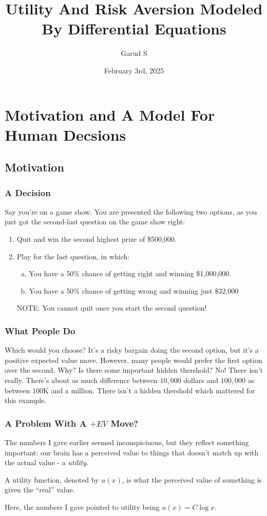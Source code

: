 \documentclass{beamer}
\title{Utility And Risk Aversion Modeled By Differential Equations}
\author{Garud S}
\date{February 3rd, 2025}
\begin{document}
\frame{\titlepage}
\section{Motivation and A Model For Human Decsions}
    \subsection{Motivation}
        \begin{frame}
            \frametitle{A Decision}
            \begin{example}
                Say you're on a game show. You are presented the following two options, as you just got the second-last question on the game show right: \pause
            \begin{enumerate}
                \item Quit and win the second highest prize of \$500,000. \pause
                \item Play for the last question, in which: \pause
                \begin{enumerate}[a)]                    
                    \item You have a 50\% chance of getting right and winning \$1,000,000.
                    \item You have a 50\% chance of getting wrong and winning just \$32,000 
                \end{enumerate} 
                \pause NOTE: You cannot quit once you start the second question!
            \end{enumerate} 
            \end{example}
        \end{frame}
        \begin{frame}\frametitle{What People Do}
            Which would you choose? It's a risky bargain doing the second option, but it's a positive expected value move. 
            \pause However, many people would prefer the first option over the second.
            Why? Is there some important hidden thershold? \pause No! There isn't really. There's about as much difference between $10,000$ dollars and $100,000$ as between $100$K and a million.
            There isn't a hidden thershold which mattered for this example.
        \end{frame}
        \begin{frame}
            \frametitle{A Problem With A $+EV$ Move?}
            The numbers I gave earlier seemed inconspiciuous, but they reflect something important: our brain has a perceived value to things that
            doesn't match up with the actual value - a \textit{utility}. \pause
            \begin{definition}
                A utility function, denoted by $u(x)$, is what the perceived value of something is given the ``real'' value.
            \end{definition} \pause
            Here, the numbers I gave pointed to utility being $u(x) = C\log x$. 
        \end{frame}
\end{document}
